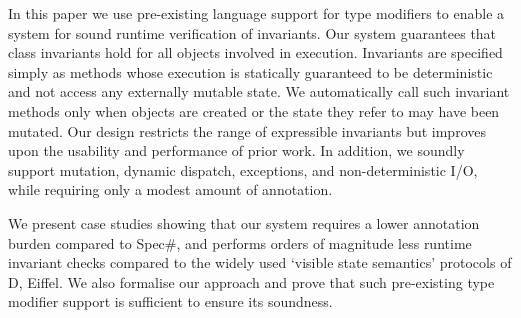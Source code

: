 In this paper we use pre-existing language support for type modifiers to enable a system for sound runtime verification of invariants.
Our system guarantees that class invariants hold for all objects involved in execution.
Invariants are specified simply as methods whose execution is statically guaranteed to be deterministic and not access any externally mutable state.
We automatically call such invariant methods only when objects are created or the state they refer to may have been mutated.
Our design restricts the range of expressible invariants but improves upon the usability and performance of prior work.
In addition, we soundly support mutation, dynamic dispatch, exceptions, and non-deterministic I/O, while requiring only a modest amount of annotation.

We present case studies showing that our system requires a lower annotation burden compared to Spec\#, and  performs orders of magnitude less runtime invariant checks compared to the widely used `visible state semantics' protocols of D, Eiffel.
We also formalise our approach and prove that such pre-existing type modifier support is sufficient to ensure its soundness. %